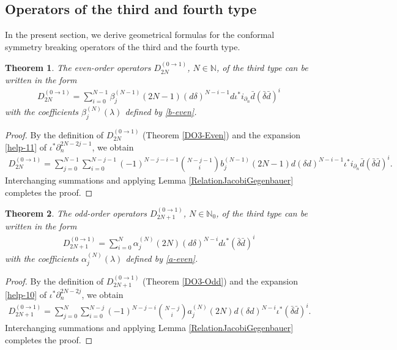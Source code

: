 \documentclass[a4paper,12pt,reqno]{amsart}
\newtheorem{theorem}{Theorem}
\numberwithin{theorem}{subsection}
\numberwithin{equation}{section}
\begin{document}
\subsection{Operators of the third and fourth type}\label{third-fourth}

In the present section, we derive geometrical formulas for the conformal
symmetry breaking operators of the third and the fourth type.

\begin{theorem}\label{CSBO-3-even} The even-order operators $D_{2N}^{(0\to 1)}$, $N \in {\mathbb{N}}$,
of the third type can be written in the form
\begin{align*}
   D_{2N}^{(0\to  1)} = \sum_{i=0}^{N-1} \beta_j^{(N-1)}(2N\!-\!1)
   ({d}\delta)^{N-i-1} {d} \iota^* i_{\partial_n}\bar{d} (\bar{\delta}\bar{d})^i
\end{align*}
with the coefficients $\beta_j^{(N)}(\lambda)$ defined by \eqref{b-even}.
\end{theorem}

\begin{proof} By the definition of $D_{2N}^{(0\to 1)}$ (Theorem \ref{DO3-Even}) and the expansion
\eqref{help-11} of $\iota^*\partial_n^{2N-2j-1}$, we obtain
\begin{align*}
   D_{2N}^{(0\to 1)} = \sum_{j=0}^{N-1} \sum_{i=0}^{N-j-1}(-1)^{N-j-i-1} \binom{N-j-1}{i}
   b_j^{(N-1)}(2N\!-\!1){d} (\delta{d})^{N-i-1} \iota^* i_{\partial_n}\bar{d}(\bar{\delta}\bar{d})^i.
\end{align*}
Interchanging summations and applying Lemma \ref{RelationJacobiGegenbauer}
completes the proof.
\end{proof}

\begin{theorem}\label{CSBO-3-odd} The odd-order operators $D_{2N+1}^{(0\to 1)}$, $N\in{\mathbb{N}}_0$, of
the third type can be written in the form
\begin{align*}
   D_{2N+1}^{(0\to 1)} = \sum_{i=0}^N \alpha_j^{(N)}(2N) ({d}\delta)^{N-i} {d}\iota^*(\bar{\delta}\bar{d})^i
\end{align*}
with the coefficients $\alpha_j^{(N)}(\lambda)$ defined by \eqref{a-even}.
\end{theorem}

\begin{proof} By the definition of $D_{2N+1}^{(0\to 1)}$ (Theorem \ref{DO3-Odd}) and the
expansion \eqref{help-10} of $\iota^*\partial_n^{2N-2j}$, we obtain
\begin{align*}
   D_{2N+1}^{(0\to 1)}=\sum_{j=0}^{N} \sum_{i=0}^{N-j} (-1)^{N-j-i} \binom{N-j}{i}
   a_j^{(N)}(2N) {d} (\delta{d})^{N-i}\iota^* (\bar{\delta}\bar{d})^i.
\end{align*}
Interchanging summations and applying Lemma \ref{RelationJacobiGegenbauer}
completes the proof.
\end{proof}
\end{document}
